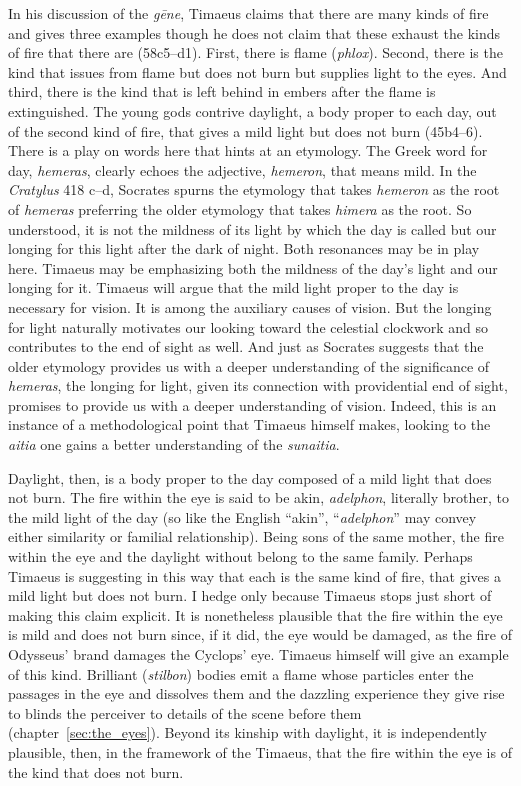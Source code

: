 In his discussion of the \emph{gēne}, Timaeus claims that there are many kinds of fire and gives three examples though he does not claim that these exhaust the kinds of fire that there are (58c5–d1). First, there is flame (\emph{phlox}). Second, there is the kind that issues from flame but does not burn but supplies light to the eyes. And third, there is the kind that is left behind in embers after the flame is extinguished. The young gods contrive daylight, a body proper to each day, out of the second kind of fire, that gives a mild light but does not burn (45b4--6). There is a play on words here that hints at an etymology. The Greek word for day, \emph{hemeras}, clearly echoes the adjective, \emph{hemeron}, that means mild. In the \emph{Cratylus} 418 c--d, Socrates spurns the etymology that takes \emph{hemeron} as the root of \emph{hemeras} preferring the older etymology that takes \emph{himera} as the root. So understood, it is not the mildness of its light by which the day is called but our longing for this light after the dark of night. Both resonances may be in play here. Timaeus may be emphasizing both the mildness of the day's light and our longing for it. Timaeus will argue that the mild light proper to the day is necessary for vision. It is among the auxiliary causes of vision. But the longing for light naturally motivates our looking toward the celestial clockwork and so contributes to the end of sight as well. And just as Socrates suggests that the older etymology provides us with a deeper understanding of the significance of \emph{hemeras}, the longing for light, given its connection with providential end of sight, promises to provide us with a deeper understanding of vision. Indeed, this is an instance of a methodological point that Timaeus himself makes, looking to the \emph{aitia} one gains a better understanding of the \emph{sunaitia}.

Daylight, then, is a body proper to the day composed of a mild light that does not burn. The fire within the eye is said to be akin, \emph{adelphon}, literally brother, to the mild light of the day (so like the English ``akin'', ``\emph{adelphon}'' may convey either similarity or familial relationship). Being sons of the same mother, the fire within the eye and the daylight without belong to the same family. Perhaps Timaeus is suggesting in this way that each is the same kind of fire, that gives a mild light but does not burn. I hedge only because Timaeus stops just short of making this claim explicit. It is nonetheless plausible that the fire within the eye is mild and does not burn since, if it did, the eye would be damaged, as the fire of Odysseus' brand damages the Cyclops' eye. Timaeus himself will give an example of this kind. Brilliant (\emph{stilbon}) bodies emit a flame whose particles enter the passages in the eye and dissolves them and the dazzling experience they give rise to blinds the perceiver to details of the scene before them (chapter~\ref{sec:the_eyes}). Beyond its kinship with daylight, it is independently plausible, then, in the framework of the Timaeus, that the fire within the eye is of the kind that does not burn.

